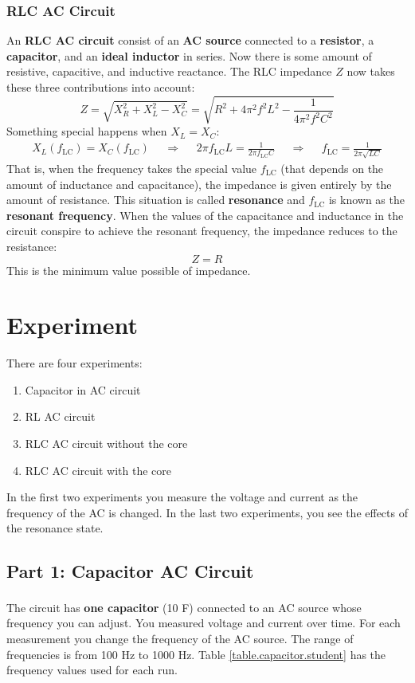 \subsubsection{RLC AC Circuit}
%
An \textbf{RLC AC circuit} consist of an \textbf{AC source} connected to a \textbf{resistor}, a \textbf{capacitor}, and an \textbf{ideal inductor} in series. Now there is some amount of resistive, capacitive, and inductive reactance. The RLC impedance $Z$ now takes these three contributions into account:
\begin{equation} \label{eq.06.eq.06.impedance.RLC}
	Z = \sqrt{X_{R}^{2} + X_{L}^{2} - X_{C}^{2}} = \sqrt{R^{2} + 4 \pi^{2} f^{2} L^{2} - \frac{1}{4 \pi^{2} f^{2} C^{2}}}
\end{equation}
Something special happens when $X_{L} = X_{C}$:
\begin{align} \label{eq.06.resonant.frequency}
	X_{L}(f_{\text{LC}}) = X_{C}(f_{\text{LC}}) && \Longrightarrow && 2\pi f_{\text{LC}} L = \frac{1}{2\pi f_{\text{LC}} C} && \Longrightarrow && f_{\text{LC}} = \frac{1}{2 \pi \sqrt{LC}}
\end{align}
That is, when the frequency takes the special value $f_{\text{LC}}$ (that depends on the amount of inductance and capacitance), the impedance is given entirely by the amount of resistance. This situation is called \textbf{resonance} and $f_{\text{LC}}$ is known as the \textbf{resonant frequency}. When the values of the capacitance and inductance in the circuit conspire to achieve the resonant frequency, the impedance reduces to the resistance:
\begin{equation}
	Z = R
\end{equation}
This is the minimum value possible of impedance.
%
\section{Experiment}
%
There are four experiments:
\begin{enumerate}
	\item Capacitor in AC circuit
	\item RL AC circuit
	\item RLC AC circuit without the core
	\item RLC AC circuit with the core
\end{enumerate}
In the first two experiments you measure the voltage and current as the frequency of the AC is changed. In the last two experiments, you see the effects of the resonance state.
%
\subsection{Part 1: Capacitor AC Circuit}
%
The circuit has \textbf{one capacitor} (10\textsuperscript{} F) connected to an AC source whose frequency you can adjust. You measured voltage and current over time. For each measurement you change the frequency of the AC source. The range of frequencies is from 100 Hz to 1000 Hz. Table \ref{table.capacitor.student} has the frequency values used for each run.

